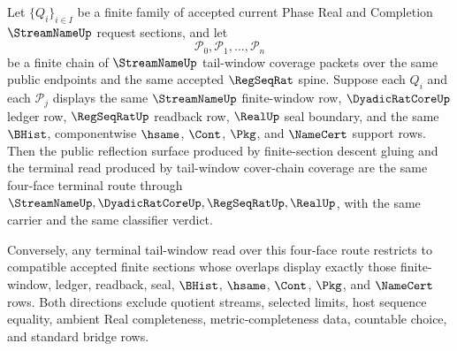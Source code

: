 \begin{theorem}
\label{thm:streamname-finite-section-tail-window-terminal-equivalence}
Let $\{Q_i\}_{i \in I}$ be a finite family of accepted current Phase Real and
Completion $\StreamNameUp$ request sections, and let
$$
\mathcal P_0,\mathcal P_1,\ldots,\mathcal P_n
$$
be a finite chain of $\StreamNameUp$ tail-window coverage packets over the
same public endpoints and the same accepted $\RegSeqRat$ spine. Suppose each
$Q_i$ and each $\mathcal P_j$ displays the same $\StreamNameUp$ finite-window
row, $\DyadicRatCoreUp$ ledger row, $\RegSeqRatUp$ readback row, $\RealUp$ seal
boundary, and the same $\BHist$, componentwise $\hsame$, $\Cont$, $\Pkg$, and
$\NameCert$ support rows. Then the public reflection surface produced by
finite-section descent gluing and the terminal read produced by tail-window
cover-chain coverage are the same four-face terminal route through
$\StreamNameUp,\DyadicRatCoreUp,\RegSeqRatUp,\RealUp$, with the same carrier
and the same classifier verdict.

Conversely, any terminal tail-window read over this four-face route restricts
to compatible accepted finite sections whose overlaps display exactly those
finite-window, ledger, readback, seal, $\BHist$, $\hsame$, $\Cont$, $\Pkg$, and
$\NameCert$ rows. Both directions exclude quotient streams, selected limits,
host sequence equality, ambient Real completeness, metric-completeness data,
countable choice, and standard bridge rows.
\end{theorem}
